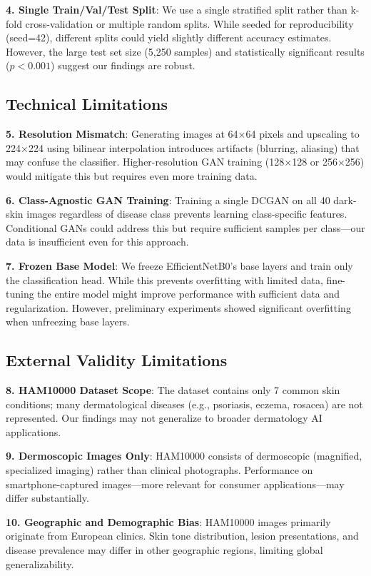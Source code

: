 \documentclass[10pt, twocolumn, letterpaper]{article}
\begin{document}
\textbf{4. Single Train/Val/Test Split}: We use a single stratified split rather than k-fold cross-validation or multiple random splits. While seeded for reproducibility (seed=42), different splits could yield slightly different accuracy estimates. However, the large test set size (5,250 samples) and statistically significant results ($p < 0.001$) suggest our findings are robust.

\subsection{Technical Limitations}

\textbf{5. Resolution Mismatch}: Generating images at 64×64 pixels and upscaling to 224×224 using bilinear interpolation introduces artifacts (blurring, aliasing) that may confuse the classifier. Higher-resolution GAN training (128×128 or 256×256) would mitigate this but requires even more training data.

\textbf{6. Class-Agnostic GAN Training}: Training a single DCGAN on all 40 dark-skin images regardless of disease class prevents learning class-specific features. Conditional GANs could address this but require sufficient samples per class—our data is insufficient even for this approach.

\textbf{7. Frozen Base Model}: We freeze EfficientNetB0's base layers and train only the classification head. While this prevents overfitting with limited data, fine-tuning the entire model might improve performance with sufficient data and regularization. However, preliminary experiments showed significant overfitting when unfreezing base layers.

\subsection{External Validity Limitations}

\textbf{8. HAM10000 Dataset Scope}: The dataset contains only 7 common skin conditions; many dermatological diseases (e.g., psoriasis, eczema, rosacea) are not represented. Our findings may not generalize to broader dermatology AI applications.

\textbf{9. Dermoscopic Images Only}: HAM10000 consists of dermoscopic (magnified, specialized imaging) rather than clinical photographs. Performance on smartphone-captured images—more relevant for consumer applications—may differ substantially.

\textbf{10. Geographic and Demographic Bias}: HAM10000 images primarily originate from European clinics. Skin tone distribution, lesion presentations, and disease prevalence may differ in other geographic regions, limiting global generalizability.
\end{document}
